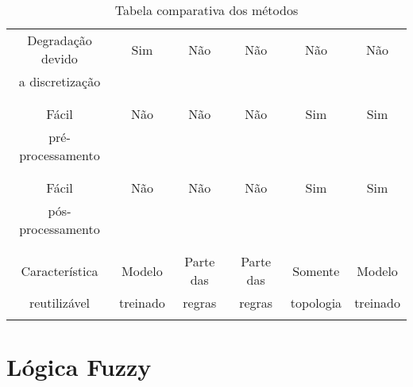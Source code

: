 \begin{table}
\begin{center}
\begin{tabular}{|c|c|c|c|c|c|}
       Degradação devido &   Sim    &    Não    &     Não      &    Não      &   Não    \\
       a discretização   &          &           &              &             &          \\
                         &          &           &              &             &          \\
       \hline                                                                           
                         &          &           &              &             &          \\
       Fácil             &   Não    &    Não    &     Não      &    Sim      &   Sim    \\
       pré-processamento &          &           &              &             &          \\
                         &          &           &              &             &          \\
       \hline                                                                           
                         &          &           &              &             &          \\
       Fácil             &   Não    &    Não    &     Não      &    Sim      &   Sim    \\
       pós-processamento &          &           &              &             &          \\
                         &          &           &              &             &          \\
       \hline                                                                           
                         &          &           &              &             &          \\
       Característica    & Modelo   & Parte das & Parte das    & Somente     & Modelo   \\
       reutilizável      & treinado & regras    & regras       & topologia   & treinado \\
                         &          &           &              &             &          \\
       \hline
     \end{tabular}
   \caption{Tabela comparativa dos métodos}
   \label{table:metodos}
   \end{center}
 \end{table}

\section{Lógica Fuzzy}

